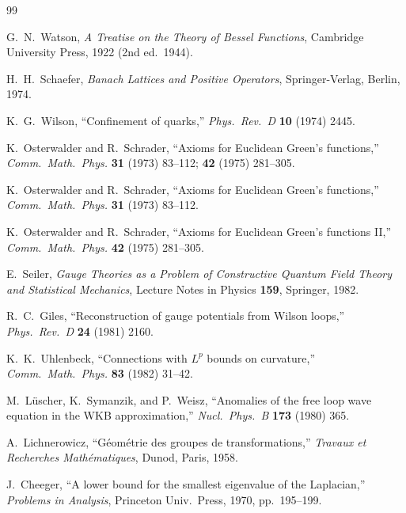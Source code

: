 \begin{thebibliography}{99}

G.~N.~Watson, \textit{A Treatise on the Theory of Bessel Functions}, 
Cambridge University Press, 1922 (2nd ed.\ 1944).

H.~H.~Schaefer, \textit{Banach Lattices and Positive Operators}, 
Springer-Verlag, Berlin, 1974.

K.~G.~Wilson, ``Confinement of quarks,'' \textit{Phys.\ Rev.\ D} \textbf{10} (1974) 2445.

K.~Osterwalder and R.~Schrader, ``Axioms for Euclidean Green's functions,'' 
\textit{Comm.\ Math.\ Phys.} \textbf{31} (1973) 83--112; \textbf{42} (1975) 281--305.

K.~Osterwalder and R.~Schrader, ``Axioms for Euclidean Green's functions,'' 
\textit{Comm.\ Math.\ Phys.} \textbf{31} (1973) 83--112.

K.~Osterwalder and R.~Schrader, ``Axioms for Euclidean Green's functions II,'' 
\textit{Comm.\ Math.\ Phys.} \textbf{42} (1975) 281--305.

E.~Seiler, \textit{Gauge Theories as a Problem of Constructive Quantum Field Theory 
and Statistical Mechanics}, Lecture Notes in Physics \textbf{159}, Springer, 1982.

R.~C.~Giles, ``Reconstruction of gauge potentials from Wilson loops,'' 
\textit{Phys.\ Rev.\ D} \textbf{24} (1981) 2160.

K.~K.~Uhlenbeck, ``Connections with $L^p$ bounds on curvature,'' 
\textit{Comm.\ Math.\ Phys.} \textbf{83} (1982) 31--42.

M.~L\"uscher, K.~Symanzik, and P.~Weisz, ``Anomalies of the free loop wave equation 
in the WKB approximation,'' \textit{Nucl.\ Phys.\ B} \textbf{173} (1980) 365.

A.~Lichnerowicz, ``G\'eom\'etrie des groupes de transformations,'' 
\textit{Travaux et Recherches Math\'ematiques}, Dunod, Paris, 1958.

J.~Cheeger, ``A lower bound for the smallest eigenvalue of the Laplacian,'' 
\textit{Problems in Analysis}, Princeton Univ.\ Press, 1970, pp.\ 195--199.


\end{thebibliography}
